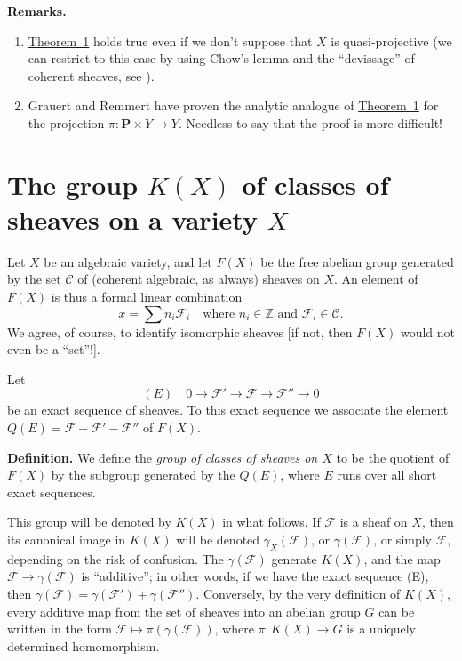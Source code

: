 \documentclass{article}
\newenvironment{rmenv}[1]
  {\phantomsection\par\medskip\noindent\textbf{#1.}\rmfamily}
  {\medskip}
\newcommand{\scr}[1]{{\mathscr{#1}}}
\renewcommand{\cal}[1]{{\mathcal{#1}}}
\newcommand{\PP}{\mathbf{P}}
\newcommand{\oldpage}[1]{\marginpar{\footnotesize$\Big\vert$ \textit{p.~#1}}}
\begin{document}
\begin{rmenv}{Remarks}
  \phantom{.}
  \begin{enumerate}
    \item \hyperref[theorem1]{Theorem~1} holds true even if we don't suppose that $X$ is quasi-projective (we can restrict to this case by using Chow's lemma and the ``devissage'' of coherent sheaves, see \cite{6}).
    \item Grauert and Remmert have proven the analytic analogue of \hyperref[theorem1]{Theorem~1} for the projection $\pi\colon\PP\times Y\to Y$.
      Needless to say that the proof is more difficult!
  \end{enumerate}
\end{rmenv}


\section{The group \texorpdfstring{$K(X)$}{K(X)} of classes of sheaves on a variety \texorpdfstring{$X$}{X}}
\label{section4}

\oldpage{105}
Let $X$ be an algebraic variety, and let $F(X)$ be the free abelian group generated by the set $\cal{C}$ of (coherent algebraic, as always) sheaves on $X$.
An element of $F(X)$ is thus a formal linear combination
\[
  x = \sum n_i\scr{F}_i
  \quad
  \mbox{where $n_i\in\mathbb{Z}$ and $\scr{F}_i\in\cal{C}$.}
\]
We agree, of course, to identify isomorphic sheaves [if not, then $F(X)$ would not even be a ``set''!].

Let
\[
  (E)\quad
  0\to\scr{F}'\to\scr{F}\to\scr{F''}\to0
\]
be an exact sequence of sheaves.
To this exact sequence we associate the element $Q(E)=\scr{F}-\scr{F}'-\scr{F}''$ of $F(X)$.

\begin{rmenv}{Definition}
  We define the \emph{group of classes of sheaves on $X$} to be the quotient of $F(X)$ by the subgroup generated by the $Q(E)$, where $E$ runs over all short exact sequences.
\end{rmenv}

This group will be denoted by $K(X)$ in what follows.
If $\scr{F}$ is a sheaf on $X$, then its canonical image in $K(X)$ will be denoted $\gamma_X(\scr{F})$, or $\gamma(\scr{F})$, or simply $\scr{F}$, depending on the risk of confusion.
The $\gamma(\scr{F})$ generate $K(X)$, and the map $\scr{F}\to\gamma(\scr{F})$ is ``additive'';
in other words, if we have the exact sequence (E), then $\gamma(\scr{F})=\gamma(\scr{F}')+\gamma(\scr{F}'')$.
Conversely, by the very definition of $K(X)$, every additive map from the set of sheaves into an abelian group $G$ can be written in the form $\scr{F}\mapsto\pi(\gamma(\scr{F}))$, where $\pi\colon K(X)\to G$ is a uniquely determined homomorphism.
\end{document}
